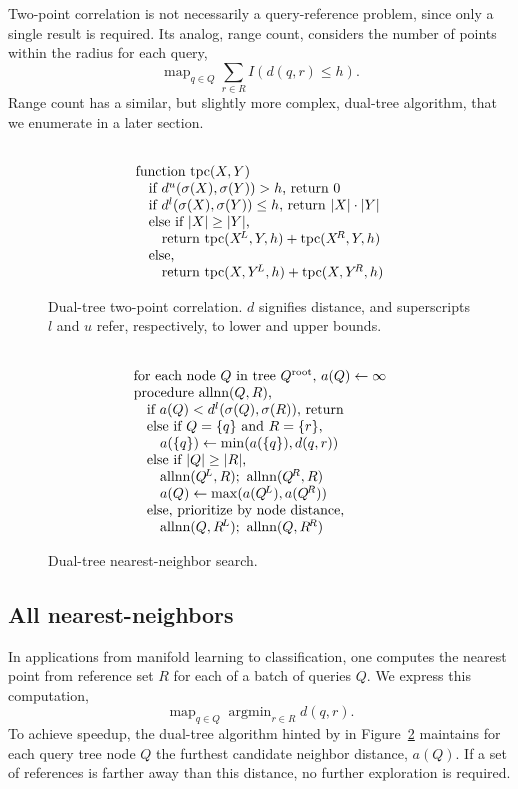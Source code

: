 \documentclass[twoside,leqno,twocolumn]{article}
\DeclareMathOperator*{\map}{map}
\DeclareMathOperator*{\argmin}{argmin}
\newcommand{\fig}[1]{Figure~\ref{fig:#1}}
\newcommand{\psty}{}
\newcommand{\X}{\\ \psty}
\newcommand{\x}{\X \hspace{0.13in}}
\newcommand{\xx}{\X \hspace{0.26in}}
\newcommand{\mysub}[1]{\subsection{#1} }
\newcommand{\kdroot}[1]{#1^{\text{root}}}
\newcommand{\kdleft}[1]{#1^{\!L}}
\newcommand{\kdright}[1]{#1^{\!R}}
\newcommand{\lo}[1]{#1^{l}}
\newcommand{\up}[1]{#1^{u}}
\newcommand{\distlo}{\lo{d}}
\newcommand{\distup}{\up{d}}
\newcommand{\dist}[2]{d(#1,#2)}
\newcommand{\outstat}{\sigma}
\begin{document}
Two-point correlation is not necessarily a query-reference problem, since only a single result is required.
Its analog, range count, considers the number of points within the radius for each query,
\[\map_{q \in Q} \sum_{r \in R} I(d(q, r) \leq h).\]
Range count has a similar, but slightly more complex, dual-tree algorithm, that we enumerate in a later section.

\begin{figure}[t]
  \begin{displaymath}
    \begin{array}[t]{l}
      \X \text{function tpc}(X, Y)
      \x \text{if }\distup(\outstat(X), \outstat(Y)) > h\text{, return }0
      \x \text{if }\distlo(\outstat(X), \outstat(Y)) \leq h\text{, return } |X| \cdot |Y|
      \x \text{else if }|X| \geq |Y|\text{,}
      \xx \text{return tpc}(\kdleft{X}, Y, h) + \text{tpc}(\kdright{X}, Y, h)
      \x \text{else,}
      \xx \text{return tpc}(X, \kdleft{Y}, h) + \text{tpc}(X, \kdright{Y}, h)
    \end{array}
  \end{displaymath}
  \caption{\label{fig:tpc} Dual-tree two-point correlation.
  $d$ signifies distance, and superscripts $l$ and $u$ refer, respectively, to lower and upper bounds.}
\end{figure}

\begin{figure}[t]
  \begin{displaymath}
   \begin{array}[t]{l}
     \X \text{for each node }Q\text{ in tree } \kdroot{Q}\text{, }a(Q) \gets \infty
     \X \text{procedure allnn}(Q,R)\text{,}
     \x \text{if }a(Q) < \distlo(\outstat(Q), \outstat(R))\text{, return}
     \x \text{else if }Q = \{q\} \text{ and } R = \{r\}\text{,}
     \xx a(\{q\}) \gets \min(a(\{q\}), \dist{q}{r})
     \x \text{else if }|Q| \geq |R|\text{,}
     \xx \text{allnn}(\kdleft{Q}, R); \text{ allnn}(\kdright{Q}, R)
     \xx a(Q) \gets \max(a(\kdleft{Q}), a(\kdright{Q}))
     \x \text{else, prioritize by node distance,}
     \xx \text{allnn}(Q, \kdleft{R}); \text{ allnn}(Q, \kdright{R})
   \end{array}
  \end{displaymath}
  \caption{\label{fig:allnn} Dual-tree nearest-neighbor search.}
\end{figure}

\mysub{All nearest-neighbors}
In applications from manifold learning to classification, one computes the nearest point from reference set $R$ for each of a batch of queries $Q$.
We express this computation,
\[\map_{q \in Q} \argmin_{r \in R} d(q,r).\]
\noindent To achieve speedup, the dual-tree algorithm hinted by \cite{gray_body} in \fig{allnn} maintains for each query tree node $Q$ the furthest candidate neighbor distance, $a(Q)$.
If a set of references is farther away than this distance, no further exploration is required.
\end{document}
